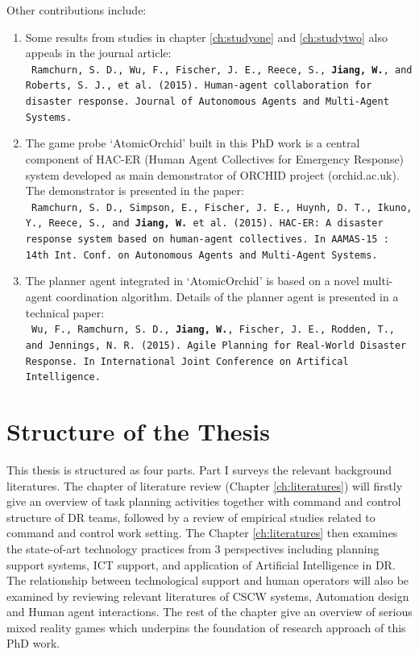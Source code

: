 Other contributions include:

\begin{enumerate}
\item Some results from studies in chapter \ref{ch:studyone} and \ref{ch:studytwo} also appeals in the journal article:\\
\texttt{ \footnotesize Ramchurn, S. D., Wu, F., Fischer, J. E., Reece, S., \textbf{Jiang, W.}, and Roberts, S. J., et al. (2015). Human-agent collaboration for disaster response. Journal of Autonomous Agents and Multi-Agent Systems.}\\

\item The game probe `AtomicOrchid' built in this PhD work is a central component of HAC-ER (Human Agent Collectives for Emergency Response) system  developed as main demonstrator of ORCHID project (orchid.ac.uk). The demonstrator is presented in the paper:\\
\texttt{ \footnotesize Ramchurn, S. D., Simpson, E., Fischer, J. E., Huynh, D. T., Ikuno, Y., Reece, S., and \textbf{ Jiang, W.} et al. (2015). HAC-ER: A disaster response system based on human-agent collectives. In AAMAS-15 : 14th Int. Conf. on Autonomous Agents and Multi-Agent Systems.} \\ 

\item The planner agent integrated in `AtomicOrchid' is based on a novel multi-agent coordination algorithm. Details of the planner agent is presented in a technical paper:\\
 \texttt{ \footnotesize Wu, F., Ramchurn, S. D., \textbf{Jiang, W.}, Fischer, J. E., Rodden, T., and Jennings, N. R. (2015). Agile Planning for Real-World Disaster Response. In International Joint Conference on Artifical Intelligence.}

\end{enumerate} 

\section{Structure of the Thesis}
This thesis is structured as four parts. Part I surveys the relevant background literatures. The chapter of literature review (Chapter \ref{ch:literatures}) will firstly give an overview of task planning activities together with command and control structure of DR teams, followed by a review of empirical studies related to command and control work setting. The Chapter \ref{ch:literatures} then examines the state-of-art technology practices from 3 perspectives including planning support systems, \ac{ICT} support, and application of Artificial Intelligence in DR. The relationship between technological support and human operators will also be examined by reviewing relevant literatures of \ac{CSCW} systems, Automation design and Human agent interactions. The rest of the chapter give an overview of serious mixed reality games which underpins the foundation of research approach of this PhD work.\\

